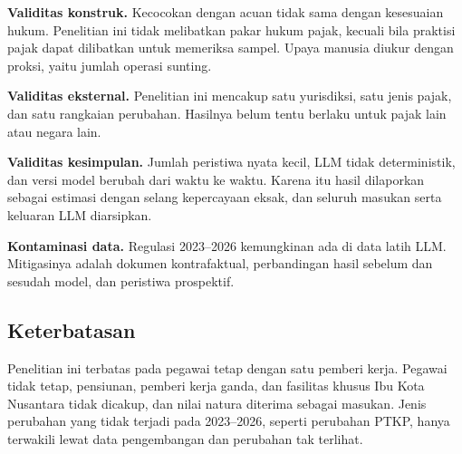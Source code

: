 \textbf{Validitas konstruk.} Kecocokan dengan acuan tidak sama dengan kesesuaian hukum. Penelitian ini tidak melibatkan pakar hukum pajak, kecuali bila praktisi pajak dapat dilibatkan untuk memeriksa sampel. Upaya manusia diukur dengan proksi, yaitu jumlah operasi sunting.

\textbf{Validitas eksternal.} Penelitian ini mencakup satu yurisdiksi, satu jenis pajak, dan satu rangkaian perubahan. Hasilnya belum tentu berlaku untuk pajak lain atau negara lain.

\textbf{Validitas kesimpulan.} Jumlah peristiwa nyata kecil, LLM tidak deterministik, dan versi model berubah dari waktu ke waktu. Karena itu hasil dilaporkan sebagai estimasi dengan selang kepercayaan eksak, dan seluruh masukan serta keluaran LLM diarsipkan.

\textbf{Kontaminasi data.} Regulasi 2023--2026 kemungkinan ada di data latih LLM. Mitigasinya adalah dokumen kontrafaktual, perbandingan hasil sebelum dan sesudah  model, dan peristiwa prospektif.

\subsection{Keterbatasan}
\label{subsec:keterbatasan}

Penelitian ini terbatas pada pegawai tetap dengan satu pemberi kerja. Pegawai tidak tetap, pensiunan, pemberi kerja ganda, dan fasilitas khusus Ibu Kota Nusantara tidak dicakup, dan nilai natura diterima sebagai masukan. Jenis perubahan yang tidak terjadi pada 2023--2026, seperti perubahan PTKP, hanya terwakili lewat data pengembangan dan perubahan tak terlihat. 
